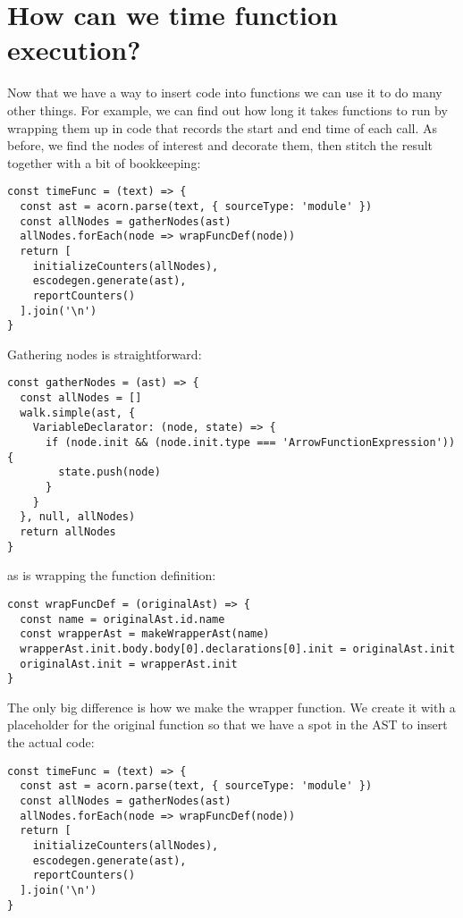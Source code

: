 \documentclass[krantzl]{krantz}
\begin{document}
\section{How can we time function execution?}\label{code-generator-time}


Now that we have a way to insert code into functions
we can use it to do many other things.
For example,
we can find out how long it takes functions to run
by wrapping them up in code that records the start and end time of each call.
As before,
we find the nodes of interest and decorate them,
then stitch the result together with a bit of bookkeeping:


\begin{lstlisting}[frame=single,frameround=tttt]
const timeFunc = (text) => {
  const ast = acorn.parse(text, { sourceType: 'module' })
  const allNodes = gatherNodes(ast)
  allNodes.forEach(node => wrapFuncDef(node))
  return [
    initializeCounters(allNodes),
    escodegen.generate(ast),
    reportCounters()
  ].join('\n')
}
\end{lstlisting}



Gathering nodes is straightforward:


\begin{lstlisting}[frame=single,frameround=tttt]
const gatherNodes = (ast) => {
  const allNodes = []
  walk.simple(ast, {
    VariableDeclarator: (node, state) => {
      if (node.init && (node.init.type === 'ArrowFunctionExpression')) {
        state.push(node)
      }
    }
  }, null, allNodes)
  return allNodes
}
\end{lstlisting}



\noindent as is wrapping the function definition:


\begin{lstlisting}[frame=single,frameround=tttt]
const wrapFuncDef = (originalAst) => {
  const name = originalAst.id.name
  const wrapperAst = makeWrapperAst(name)
  wrapperAst.init.body.body[0].declarations[0].init = originalAst.init
  originalAst.init = wrapperAst.init
}
\end{lstlisting}



The only big difference is how we make the wrapper function.
We create it with a placeholder for the original function
so that we have a spot in the AST to insert the actual code:


\begin{lstlisting}[frame=single,frameround=tttt]
const timeFunc = (text) => {
  const ast = acorn.parse(text, { sourceType: 'module' })
  const allNodes = gatherNodes(ast)
  allNodes.forEach(node => wrapFuncDef(node))
  return [
    initializeCounters(allNodes),
    escodegen.generate(ast),
    reportCounters()
  ].join('\n')
}
\end{lstlisting}
\end{document}
